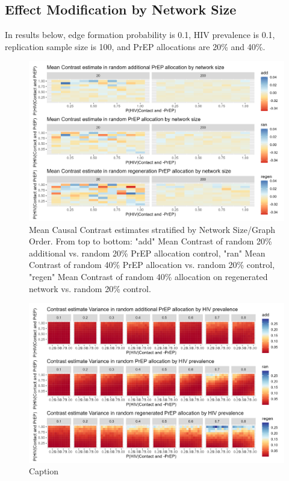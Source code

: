 \documentclass{article}
\theoremstyle{definition}
\begin{document}
\subsection{Effect Modification by Network Size}
In results below, edge formation probability is 0.1, HIV prevalence is 0.1, replication sample size is 100, and PrEP allocations are 20\% and 40\%.
\begin{figure}
    \centering
    \includegraphics[scale=0.7]{Figures/Network Size Mean Plot.png}
    \caption{Mean Causal Contrast estimates stratified by Network Size/Graph Order. From top to bottom: "add" Mean Contrast of random 20\% additional vs. random 20\% PrEP allocation control, "ran" Mean Contrast of random 40\% PrEP allocation vs. random 20\% control, "regen" Mean Contrast of random 40\% allocation on regenerated network vs. random 20\% control. }
    \label{fig:Figure 7}
\end{figure}
\begin{figure}
    \centering
    \includegraphics[scale=0.7]{Figures/HIV Prevalence Variance plots.png}
    \caption{Caption}
    \label{fig:Figure 8}
\end{figure}
\end{document}
